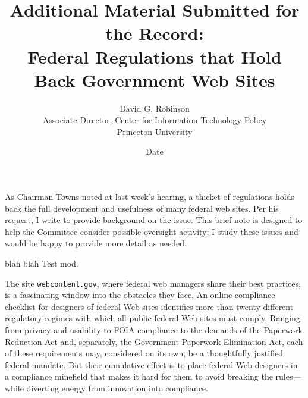 \documentclass{article}
\title{Additional Material Submitted for the Record: \\
Federal Regulations that Hold Back Government Web Sites}
\author{David G. Robinson\\
Associate Director, Center for Information Technology Policy\\
Princeton University}
\date{Date}
\begin{document}
   \maketitle
 As Chairman Towns noted at last week's hearing, a thicket of regulations 
holds back the full development and usefulness of many federal web sites. Per 
his request, I write to provide background on the issue. This brief note is 
designed to help the Committee consider possible oversight activity; I study 
these issues and would be happy to provide more detail as needed.


blah blah Test mod.

The site \texttt{webcontent.gov}, where federal web managers share their best 
practices, is a fascinating window into the obstacles they face. An online 
compliance checklist for designers of federal Web sites identifies more than 
twenty different regulatory regimes with which all public federal Web sites 
must comply.  Ranging from privacy and usability to FOIA compliance to the 
demands of the Paperwork Reduction Act and, separately, the Government 
Paperwork Elimination Act, each of these requirements may, considered on its 
own, be a thoughtfully justified federal mandate. But their cumulative effect 
is to place federal Web designers in a compliance minefield that makes it hard 
for them to avoid breaking the rules—while diverting energy from innovation 
into compliance.


\end{document}

